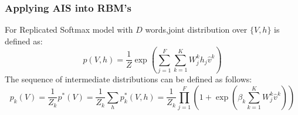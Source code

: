 \documentclass{beamer}
\begin{document}
\begin{CJK*}{UTF8}{gbsn}
\begin{frame}\frametitle{Applying AIS into RBM's}
For Replicated Softmax model with $D$ words,joint distribution over $\{V,h\}$ is defined as:
\begin{equation}
p(V,h)=\frac{1}{Z}\exp(\sum_{j=1}^F\sum_{k=1}^KW_j^kh_j\hat{v}^k)
\end{equation}
The sequence of intermediate distributions can be defined as follows:
\begin{equation}
p_k(V)=\frac{1}{Z_k}p^\ast(V)=\frac{1}{Z_k}\sum_hp_k^\ast(V,h)=\frac{1}{Z_k}\prod_{j=1}^F(1+\exp(\beta_k\sum_{k=1}^KW_j^k\hat{v}^k))
\end{equation}
\end{frame}
\end{CJK*}
\end{document}
